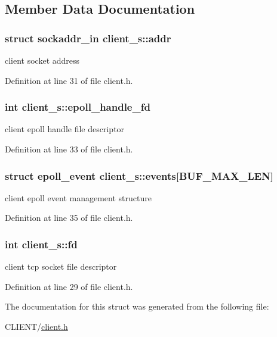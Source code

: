\subsection{Member Data Documentation}
\hypertarget{structclient__s_a0462afe1661e70a0c69fa24f39387d0f}{
\subsubsection[{addr}]{\setlength{\rightskip}{0pt plus 5cm}struct sockaddr\-\_\-in client\-\_\-s\-::addr}}\label{structclient__s_a0462afe1661e70a0c69fa24f39387d0f}


client socket address 



Definition at line 31 of file client.\-h.

\hypertarget{structclient__s_aadebb75dc03b9055f20d18e6a78865c4}{
\subsubsection[{epoll\-\_\-handle\-\_\-fd}]{\setlength{\rightskip}{0pt plus 5cm}int client\-\_\-s\-::epoll\-\_\-handle\-\_\-fd}}\label{structclient__s_aadebb75dc03b9055f20d18e6a78865c4}


client epoll handle file descriptor 



Definition at line 33 of file client.\-h.

\hypertarget{structclient__s_a06588602dcf6728b79196b73271edf97}{
\subsubsection[{events}]{\setlength{\rightskip}{0pt plus 5cm}struct epoll\-\_\-event client\-\_\-s\-::events\mbox{[}{\bf B\-U\-F\-\_\-\-M\-A\-X\-\_\-\-L\-E\-N}\mbox{]}}}\label{structclient__s_a06588602dcf6728b79196b73271edf97}


client epoll event management structure 



Definition at line 35 of file client.\-h.

\hypertarget{structclient__s_a9babf0c4dea4b555e6b87a47f4ca98cd}{
\subsubsection[{fd}]{\setlength{\rightskip}{0pt plus 5cm}int client\-\_\-s\-::fd}}\label{structclient__s_a9babf0c4dea4b555e6b87a47f4ca98cd}


client tcp socket file descriptor 



Definition at line 29 of file client.\-h.



The documentation for this struct was generated from the following file\-:\begin{DoxyCompactItemize}
\item 
C\-L\-I\-E\-N\-T/\hyperlink{client_8h}{client.\-h}\end{DoxyCompactItemize}
